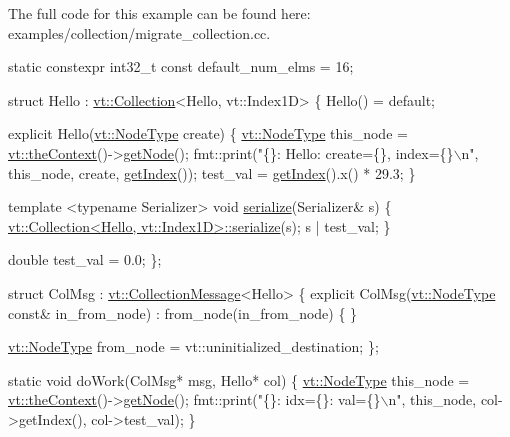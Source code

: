 The full code for this example can be found here\+: {\ttfamily examples/collection/migrate\+\_\+collection.\+cc}.


\begin{DoxyCodeInclude}
\textcolor{keyword}{static} constexpr int32\_t \textcolor{keyword}{const} default\_num\_elms = 16;

\textcolor{keyword}{struct }Hello : \hyperlink{structvt_1_1vrt_1_1collection_1_1_collection}{vt::Collection}<Hello, vt::Index1D> \{
  Hello() = \textcolor{keywordflow}{default};

  \textcolor{keyword}{explicit} Hello(\hyperlink{namespacevt_a866da9d0efc19c0a1ce79e9e492f47e2}{vt::NodeType} create) \{
    \hyperlink{namespacevt_a866da9d0efc19c0a1ce79e9e492f47e2}{vt::NodeType} this\_node = \hyperlink{namespacevt_a26551fe0e6e6a1371111df5b12c7e92c}{vt::theContext}()->\hyperlink{structvt_1_1ctx_1_1_context_a0d52c263ce8516546a67443d9a86fa5f}{getNode}();
    fmt::print(\textcolor{stringliteral}{"\{\}: Hello: create=\{\}, index=\{\}\(\backslash\)n"}, this\_node, create, \hyperlink{structvt_1_1vrt_1_1collection_1_1_indexable_a28d05f23e7a20e12e94b8235305c1e82}{getIndex}());
    test\_val = \hyperlink{structvt_1_1vrt_1_1collection_1_1_indexable_a28d05f23e7a20e12e94b8235305c1e82}{getIndex}().x() * 29.3;
  \}

  \textcolor{keyword}{template} <\textcolor{keyword}{typename} Serializer>
  \textcolor{keywordtype}{void} \hyperlink{structvt_1_1vrt_1_1collection_1_1_collection_base_a8f5dc077e523958ea8b7290b8a10846f}{serialize}(Serializer& s) \{
    \hyperlink{structvt_1_1vrt_1_1collection_1_1_collection_base_a8f5dc077e523958ea8b7290b8a10846f}{vt::Collection<Hello, vt::Index1D>::serialize}(s);
    s | test\_val;
  \}

  \textcolor{keywordtype}{double} test\_val = 0.0;
\};

\textcolor{keyword}{struct }ColMsg : \hyperlink{structvt_1_1vrt_1_1collection_1_1_collection_message}{vt::CollectionMessage}<Hello> \{
  \textcolor{keyword}{explicit} ColMsg(\hyperlink{namespacevt_a866da9d0efc19c0a1ce79e9e492f47e2}{vt::NodeType} \textcolor{keyword}{const}& in\_from\_node)
    : from\_node(in\_from\_node)
  \{ \}

  \hyperlink{namespacevt_a866da9d0efc19c0a1ce79e9e492f47e2}{vt::NodeType} from\_node = vt::uninitialized\_destination;
\};

\textcolor{keyword}{static} \textcolor{keywordtype}{void} doWork(ColMsg* msg, Hello* col) \{
  \hyperlink{namespacevt_a866da9d0efc19c0a1ce79e9e492f47e2}{vt::NodeType} this\_node = \hyperlink{namespacevt_a26551fe0e6e6a1371111df5b12c7e92c}{vt::theContext}()->\hyperlink{structvt_1_1ctx_1_1_context_a0d52c263ce8516546a67443d9a86fa5f}{getNode}();
  fmt::print(\textcolor{stringliteral}{"\{\}: idx=\{\}: val=\{\}\(\backslash\)n"}, this\_node, col->getIndex(), col->test\_val);
\}


\end{DoxyCodeInclude}
